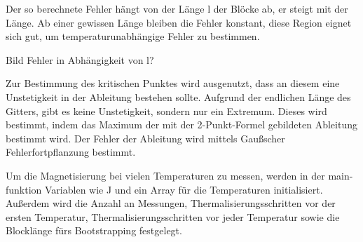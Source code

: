 \documentclass{scrreprt}
\begin{document}
	
	Der so berechnete Fehler hängt von der Länge l der Blöcke ab, er steigt mit der Länge. Ab einer gewissen Länge bleiben die Fehler konstant, diese Region eignet sich gut, um temperaturunabhängige Fehler zu bestimmen.
	
	Bild Fehler in Abhängigkeit von l?
	
	Zur Bestimmung des kritischen Punktes wird ausgenutzt, dass an diesem eine Unstetigkeit in der Ableitung bestehen sollte. Aufgrund der endlichen Länge des Gitters, gibt es keine Unstetigkeit, sondern nur ein Extremum. Dieses wird bestimmt, indem das Maximum der mit der 2-Punkt-Formel gebildeten Ableitung bestimmt wird. Der Fehler der Ableitung wird mittels Gaußscher Fehlerfortpflanzung bestimmt.
		
	Um die Magnetisierung bei vielen Temperaturen zu messen, werden in der main-funktion Variablen wie J und ein Array für die Temperaturen initialisiert. Außerdem wird die Anzahl an Messungen, Thermalisierungsschritten vor der ersten Temperatur, Thermalisierungsschritten vor jeder Temperatur sowie die Blocklänge fürs Bootstrapping festgelegt. 	
	
\end{document}
